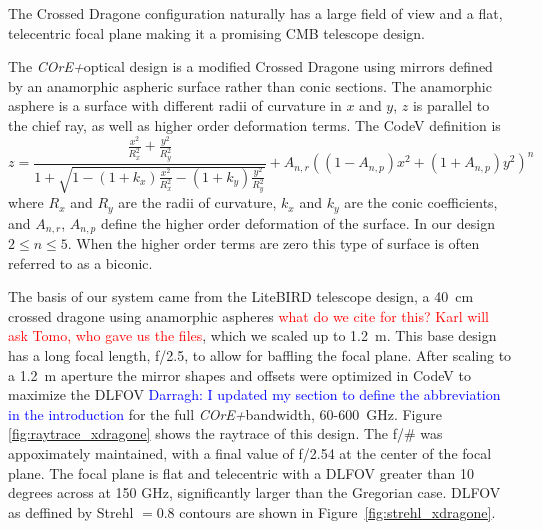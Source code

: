 \documentclass[11pt,a4paper]{article}
\newcommand{\comred}[1]{\textcolor{red}{#1}}
\newcommand{\comblue}[1]{\textcolor{blue}{#1}}
\newcommand{\coreplus}{\textit{\negthinspace COrE+\/}}
\begin{document}
The Crossed Dragone configuration \cite{tran_2008, granet_2001} naturally has a large 
field of view and a flat, telecentric focal plane making it a promising CMB telescope design. 


The \coreplus optical design is a modified Crossed Dragone using mirrors defined by an anamorphic aspheric 
surface rather than conic sections. 
The anamorphic asphere is a surface with different radii of curvature in $x$ and $y$, $z$ is parallel to 
the chief ray, 
as well as higher order deformation terms.
The CodeV definition is 
$$ z = \frac{\frac{x^2}{R_x^2} + \frac{y^2}{R_y^2}}
{ 1 + \sqrt{1 - (1+k_x) \frac{x^2}{R_x^2} - (1+k_y) \frac{y^2}{R_y^2}}}
+ A_{n,r} ( (1-A_{n,p})x^2 + (1 + A_{n,p})y^2)^n
$$
where $R_x$ and $R_y$ are the radii of curvature, $k_x$ and $k_y$ are the conic coefficients, and $A_{n,r}$, $A_{n,p}$
define the higher order deformation of the surface. In our design $2 \leq n \leq 5$. When the higher order terms are zero this 
type of surface is often referred to as a biconic.

The basis of our system came from the LiteBIRD telescope design, a 40~cm crossed dragone using anamorphic 
aspheres 
\cite{litebird} \comred{what do we cite for this? Karl will ask Tomo, who gave us the files}, which we scaled up to 1.2~m. 
This base design has a long focal length, f/2.5, to allow 
for baffling the focal plane.  After scaling to a 1.2~m aperture the mirror shapes and offsets were optimized 
in CodeV to maximize the DLFOV \comblue{Darragh: I updated my section to define the abbreviation in the introduction} for the full \coreplus bandwidth, 60-600~GHz.  
Figure \ref{fig:raytrace_xdragone} 
shows the raytrace of this design. The f/\# was appoximately maintained, with a final value of f/2.54 at the 
center of the focal plane.
The focal plane is flat and telecentric with a DLFOV greater than 10 degrees across at 150 GHz, significantly larger than the 
Gregorian case.  DLFOV as deffined by Strehl $=0.8$ contours are shown in Figure~\ref{fig:strehl_xdragone}.
\end{document}
